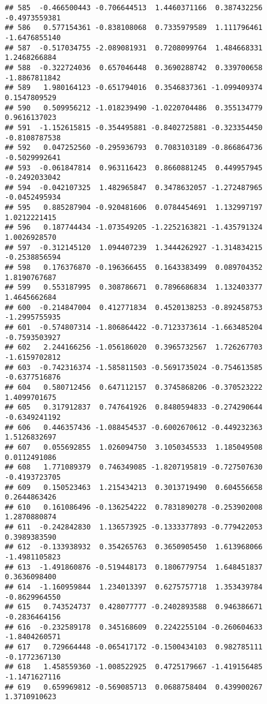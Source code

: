 \documentclass[
]{article}
\begin{document}
\begin{verbatim}
## 585  -0.466500443 -0.706644513  1.4460371166  0.387432256 -0.4973559381
## 586   0.577154361 -0.838108068  0.7335979589  1.111796461 -1.6476855140
## 587  -0.517034755 -2.089081931  0.7208099764  1.484668331  1.2468266884
## 588  -0.322724036  0.657046448  0.3690288742  0.339700658 -1.8867811842
## 589   1.980164123 -0.651794016  0.3546837361 -1.099409374  0.1547809529
## 590   0.509956212 -1.018239490 -1.0220704486  0.355134779  0.9616137023
## 591  -1.152615815 -0.354495881 -0.8402725881 -0.323354450 -0.8108787538
## 592   0.047252560 -0.295936793  0.7083103189 -0.866864736 -0.5029992641
## 593  -0.061847814  0.963116423  0.8660881245  0.449957945 -0.2492033042
## 594  -0.042107325  1.482965847  0.3478632057 -1.272487965 -0.0452495934
## 595   0.885287904 -0.920481606  0.0784454691  1.132997197  1.0212221415
## 596   0.187744434 -1.073549205 -1.2252163821 -1.435791324  1.0026928570
## 597  -0.312145120  1.094407239  1.3444262927 -1.314834215 -0.2538856594
## 598   0.176376870 -0.196366455  0.1643383499  0.089704352  1.8190767687
## 599   0.553187995  0.308786671  0.7896686834  1.132403377  1.4645662684
## 600  -0.214847004  0.412771834  0.4520138253 -0.892458753 -1.2995755935
## 601  -0.574807314 -1.806864422 -0.7123373614 -1.663485204 -0.7593503927
## 602   2.244166256 -1.056186020  0.3965732567  1.726267703 -1.6159702812
## 603  -0.742316374 -1.585811503 -0.5691735024 -0.754613585 -0.6377516876
## 604   0.580712456  0.647112157  0.3745868206 -0.370523222  1.4099701675
## 605   0.317912837  0.747641926  0.8480594833 -0.274290644 -0.6349241192
## 606   0.446357436 -1.088454537 -0.6002670612 -0.449232363  1.5126832697
## 607   0.055692855  1.026094750  3.1050345533  1.185049508  0.0112491086
## 608   1.771089379  0.746349085 -1.8207195819 -0.727507630 -0.4193723705
## 609   0.150523463  1.215434213  0.3013719490  0.604556658  0.2644863426
## 610   0.161086496 -0.136254222  0.7831890278 -0.253902008  1.2870880874
## 611  -0.242842830  1.136573925 -0.1333377893 -0.779422053  0.3989383590
## 612  -0.133938932  0.354265763  0.3650905450  1.613968066 -1.4981105823
## 613  -1.491860876 -0.519448173  0.1806779754  1.648451837  0.3636098400
## 614  -1.160959844  1.234013397  0.6275757718  1.353439784 -0.8629964550
## 615   0.743524737  0.428077777 -0.2402893588  0.946386671 -0.2836464156
## 616  -0.232589178  0.345168609  0.2242255104 -0.260604633 -1.8404260571
## 617   0.729664448 -0.065417172 -0.1500434103  0.982785111 -0.1772367130
## 618   1.458559360 -1.008522925  0.4725179667 -1.419156485 -1.1471627116
## 619   0.659969812 -0.569085713  0.0688758404  0.439900267  1.3710910623

\end{verbatim}
\end{document}
